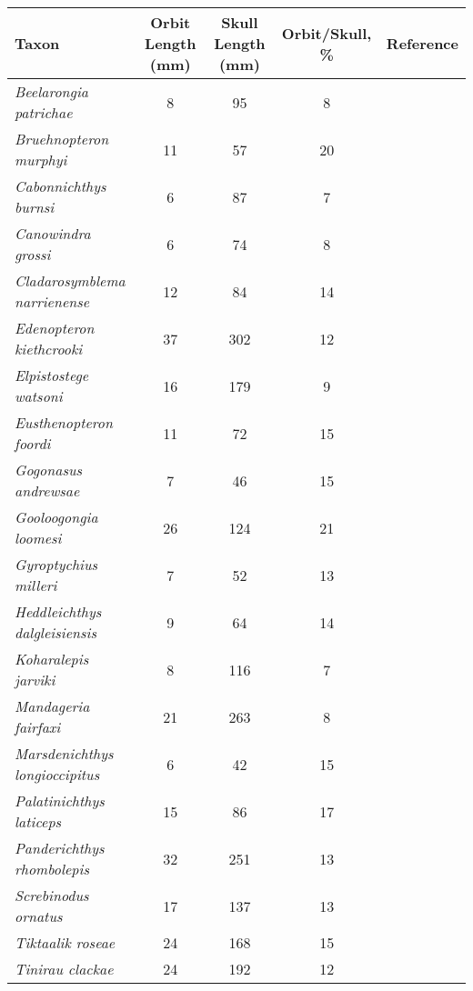 \begin{tabular}{|L{4.5cm}|c|c|c|L{4.5cm}|}
\hline
\textbf{Taxon}&\textbf{Orbit Length (mm)}&\textbf{Skull Length (mm)}&\textbf{Orbit/Skull, \%}&\textbf{Reference}\\\hline
\textit{Beelarongia patrichae}&8&95&8&\citet{Long87a}\\\hline
\textit{Bruehnopteron  murphyi}&11&57&20&\citet{Schu12a}\\\hline
\textit{Cabonnichthys burnsi}&6&87&7&\citet{Ahlb97a}\\\hline
\textit{Canowindra grossi}&6&74&8&\citet{Long85a}\\\hline
\textit{Cladarosymblema narrienense}&12&84&14&\citet{Fox95a}\\\hline
\textit{Edenopteron kiethcrooki}&37&302&12&\citet{Youn13a}\\\hline
\textit{Elpistostege watsoni}&16&179&9&\citet{Schu85a}\\\hline
\textit{Eusthenopteron foordi}&11&72&15&\citet{Mark07a}\\\hline
\textit{Gogonasus andrewsae}&7&46&15&\citet{Long06a}\\\hline
\textit{Gooloogongia loomesi}&26&124&21&\citet{Joha98a}\\\hline
\textit{Gyroptychius  milleri}&7&52&13&\citet{Newm15a}\\\hline
\textit{Heddleichthys dalgleisiensis}&9&64&14&\citet{Snit09a}\\\hline
\textit{Koharalepis jarviki}&8&116&7&\citet{Youn92a}\\\hline
\textit{Mandageria fairfaxi}&21&263&8&\citet{Joha97a}\\\hline
\textit{Marsdenichthys longioccipitus}&6&42&15&\citet{Holl10a}\\\hline
\textit{Palatinichthys laticeps}&15&86&17&\citet{Witz12a}\\\hline
\textit{Panderichthys rhombolepis}&32&251&13&\citet{Voro91a}\\\hline
\textit{Screbinodus ornatus}&17&137&13&\citet{Jeff12a}\\\hline
\textit{Tiktaalik roseae}&24&168&15&\citet{Daes06a}\\\hline
\textit{Tinirau clackae}&24&192&12&\citet{Swar12a}\\\hline
\end{tabular}
